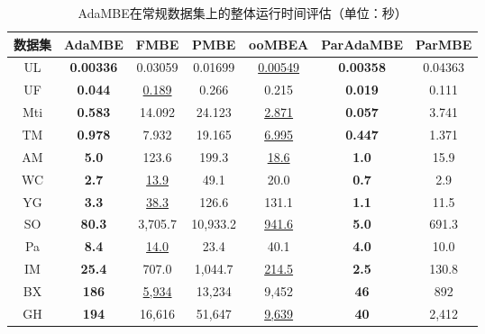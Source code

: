 \begin{table} [H]
	\centering    
	\setlength{\abovecaptionskip}{0cm}  
  \setlength{\belowcaptionskip}{-0.1cm}
	\caption{AdaMBE在常规数据集上的整体运行时间评估（单位：秒）}      
	\label{tbl:ada_time}
	\setlength{\tabcolsep}{5pt}
	\begin{center}
				\normalsize{
		\begin{tabular}{ccccc|cc}
			\hline 

      \textbf{数据集} & \textbf{AdaMBE} & \textbf{FMBE} & \textbf{PMBE} & \textbf{ooMBEA} & \textbf{ParAdaMBE} & \textbf{ParMBE} \\ \hline

      UL	&\textbf{0.00336}	&0.03059	&0.01699	&\uline{0.00549}	&\textbf{0.00358}	&0.04363 \\
      UF &	\textbf{0.044}	&\uline{0.189}	&0.266	&0.215	&\textbf{0.019}	&0.111 \\
      Mti	&\textbf{0.583}	&14.092	&24.123	&\uline{2.871}	&\textbf{0.057}	&3.741 \\
      TM	&\textbf{0.978}	&7.932	&19.165	&\uline{6.995}	&\textbf{0.447}	&1.371 \\      
      AM & \textbf{5.0} & 123.6 & 199.3 & \uline{18.6} & \textbf{1.0} & 15.9 \\
      WC & \textbf{2.7} & \uline{13.9} & 49.1 & 20.0 & \textbf{0.7} & 2.9 \\
      YG & \textbf{3.3} & \uline{38.3} & 126.6 & 131.1 & \textbf{1.1} & 11.5 \\
      SO & \textbf{80.3} & 3,705.7 & 10,933.2 & \uline{941.6} & \textbf{5.0} & 691.3 \\
      Pa & \textbf{8.4} & \uline{14.0} & 23.4 & 40.1 & \textbf{4.0} & 10.0 \\
      IM & \textbf{25.4} & 707.0 & 1,044.7 & \uline{214.5} & \textbf{2.5} & 130.8 \\
      BX & \textbf{186} & \uline{5,934} & 13,234 & 9,452 & \textbf{46} & 892 \\
      GH & \textbf{194} & 16,616 & 51,647 & \uline{9,639} & \textbf{40} & 2,412 \\
      
      \hline
      
		\end{tabular}
				}
	\end{center}
  \vspace{-8pt}
\end{table}
